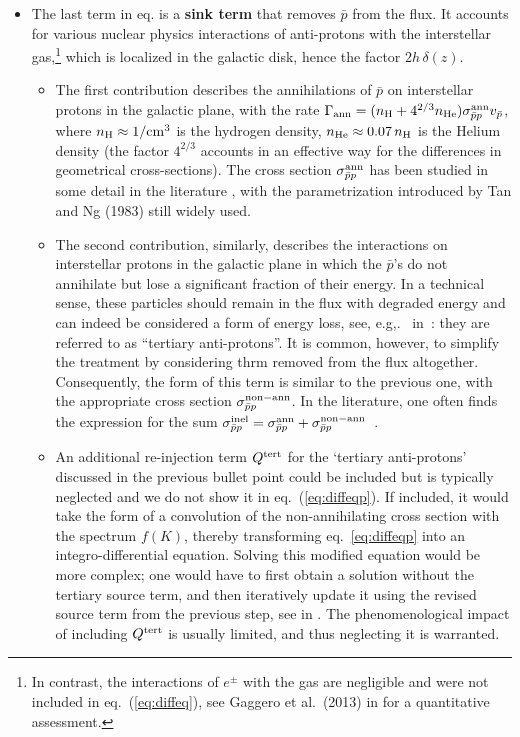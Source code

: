 \begin{itemize}
\item[$\triangleright$]
The last term in eq. is a {\bf sink term} that removes $\bar p$ from the flux. It accounts for various nuclear physics interactions of anti-protons with the interstellar gas,\footnote{In contrast, the interactions of $e^\pm$ with the gas are negligible and were not included in eq.~(\ref{eq:diffeq}), see 
Gaggero et al.~(2013) in \cite{CRenergylosses} for a quantitative assessment.} which is localized in the galactic disk, hence the factor $2 h \, \delta(z)$. 
\begin{itemize}
\item The first contribution describes the annihilations of $\bar p$ on interstellar protons in the galactic plane, with the rate
$\Gamma_{\rm ann} = (n_{\rm H} + 4^{2/3} n_{\rm He}) \sigma^{\rm ann}_{\bar{p}p} v_{\bar{p}}$,
where $n_{\rm H}\approx 1/{\rm cm}^3$ is the hydrogen density, $n_{\rm He}\approx 0.07\, n_{\rm H}$ is the Helium density (the factor $4^{2/3}$ accounts in an effective way for the differences in geometrical cross-sections).
The cross section $ \sigma^{\rm ann}_{\bar{p}p}$ has been studied in some detail in the literature \cite{Pbarcrosssections}, with the parametrization  introduced by Tan and Ng (1983) still widely used. 

\item The second contribution, similarly, describes the interactions on interstellar protons in the galactic plane in which the $\bar p$'s do not annihilate but lose a significant fraction of their energy. 
In a technical sense, these particles should remain in the flux with degraded energy and
can indeed be considered a form of energy loss, see, e.g,.~ in~\cite{Pbarenergylosses}: they are referred to as ``tertiary anti-protons''. 
It is common, however, to simplify the treatment by considering thrm removed from the flux altogether.
Consequently, the form of this term is similar to the previous one, with the appropriate cross section $\sigma^{\rm non-ann}_{\bar{p}p}$.  In the literature, one often finds the expression for the sum $\sigma^{\rm inel}_{\bar{p}p} = \sigma^{\rm ann}_{\bar{p}p} + \sigma^{\rm non-ann}_{\bar{p}p}$~\cite{Pbarcrosssections,PPPC4DMID}.
\item An additional re-injection term $Q^{\rm tert}$ for the `tertiary anti-protons' discussed in the previous bullet point could be included but is typically neglected and we do not show it in eq.~(\ref{eq:diffeqp}).
If included, it would take the form of a convolution of the non-annihilating cross section with the spectrum $f(K)$, thereby transforming eq.~\eqref{eq:diffeqp} into an integro-differential equation. Solving this modified equation
would be more complex; one would have to first obtain a solution without the tertiary source term, and then iteratively update it  using the revised source term from the previous step, see  in \cite{Pbarcrosssections}. The phenomenological impact of including $Q^{\rm tert}$ is usually limited, and thus neglecting it is warranted.   
\end{itemize}
 \end{itemize}
 
